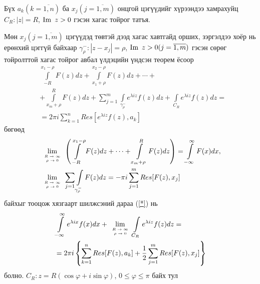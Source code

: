\begin{prf}
Бүх $a_k(k=\overline{1,n})$ ба $x_j(j=\overline{1,m})$ онцгой цэгүүдийг хүрээндээ хамрахуйц $C_R:|z|=R$, $\operatorname{\textrm{\normalfont{Im }}} z>0$ гэсэн хагас тойрог татъя.

Мөн $x_j(j=\overline{1,m})$ цэгүүдэд төвтэй дээд хагас хавтгайд орших, зэргэлдээ хоёр нь ерөнхий цэггүй байхаар $\gamma^-_\rho: |z-x_j|=\rho$, $\operatorname{\textrm{\normalfont{Im }}} z>0(j=\overline{1,m})$ гэсэн сөрөг тойролттой хагас тойрог авбал үлдэцийн үндсэн теорем ёсоор 
\begin{equation}
    \tag{$*$} \label{*}
    \begin{split}
        &\int\limits_{-R}^{x_1-\rho}F(z)dz+\int\limits_{x_1+\rho}^{x_2-\rho}F(z)dz+\cdots +\\
        &+\int\limits_{x_m+\rho}^RF(z)dz+\sum\limits_{j=1}^m \int\limits_{\gamma_\rho^-}e^{\lambda i z}f(z)dz+\int\limits_{C_R}e^{\lambda iz}f(z)dz = \\
        &=2\pi i\sum\limits_{k=1}^n Res[e^{\lambda iz} f(z), a_k]
    \end{split} 
\end{equation} бөгөөд 
\begin{align*}
    &\lim\limits_{\tiny{\begin{array}{c}
R\to\infty  \\
 \rho\to 0 
\end{array}}}  \left(\int\limits_{-R}^{x_1-\rho} F(z)dz+\cdots +\int\limits_{x_m+\rho}^R F(z)dz\right)=\int\limits_{-\infty}^\infty F(x)dx, \\
    &\lim\limits_{\tiny{\begin{array}{c}
R\to\infty  \\
 \rho\to 0 
\end{array}}}\sum\limits_{j=1}\int\limits_{\gamma^-_\rho}F(z)dz=-\pi i\sum\limits_{j=1}^m Res[F(z), x_j]
\end{align*}
байхыг тооцож хязгаарт шилжсэний дараа (\ref{*}) нь 
\begin{align*}
    &\int\limits_{-\infty}^\infty e^{\lambda ix}f(x)dx+\lim\limits_{\tiny{\begin{array}{c}
R\to\infty  \\
 \rho\to 0 
\end{array}}} \int\limits_{C_R} e^{\lambda iz}f(z)dz= \\
    &=2\pi i\left\{\sum\limits_{k=1}^n Res[F(z), a_k]+\frac{1}{2}\sum\limits_{j=1}^m Res [F(z), x_j]\right\}
\end{align*}
болно. $C_R:z=R(\cos \varphi +i\sin\varphi)$, $0\leq \varphi \leq \pi$ байх тул 
\begin{align*}

\end{align*}
\end{prf}
